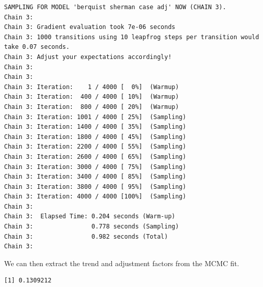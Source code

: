 \documentclass[
  letterpaper,
  DIV=11,
  numbers=noendperiod]{scrartcl}
\newenvironment{Shaded}{\begin{snugshade}}{\end{snugshade}}
\newcommand{\AttributeTok}[1]{\textcolor[rgb]{0.40,0.45,0.13}{#1}}
\newcommand{\FunctionTok}[1]{\textcolor[rgb]{0.28,0.35,0.67}{#1}}
\newcommand{\NormalTok}[1]{\textcolor[rgb]{0.00,0.23,0.31}{#1}}
\newcommand{\OtherTok}[1]{\textcolor[rgb]{0.00,0.23,0.31}{#1}}
\newcommand{\SpecialCharTok}[1]{\textcolor[rgb]{0.37,0.37,0.37}{#1}}
\begin{document}
\begin{verbatim}
SAMPLING FOR MODEL 'berquist sherman case adj' NOW (CHAIN 3).
Chain 3: 
Chain 3: Gradient evaluation took 7e-06 seconds
Chain 3: 1000 transitions using 10 leapfrog steps per transition would take 0.07 seconds.
Chain 3: Adjust your expectations accordingly!
Chain 3: 
Chain 3: 
Chain 3: Iteration:    1 / 4000 [  0%]  (Warmup)
Chain 3: Iteration:  400 / 4000 [ 10%]  (Warmup)
Chain 3: Iteration:  800 / 4000 [ 20%]  (Warmup)
Chain 3: Iteration: 1001 / 4000 [ 25%]  (Sampling)
Chain 3: Iteration: 1400 / 4000 [ 35%]  (Sampling)
Chain 3: Iteration: 1800 / 4000 [ 45%]  (Sampling)
Chain 3: Iteration: 2200 / 4000 [ 55%]  (Sampling)
Chain 3: Iteration: 2600 / 4000 [ 65%]  (Sampling)
Chain 3: Iteration: 3000 / 4000 [ 75%]  (Sampling)
Chain 3: Iteration: 3400 / 4000 [ 85%]  (Sampling)
Chain 3: Iteration: 3800 / 4000 [ 95%]  (Sampling)
Chain 3: Iteration: 4000 / 4000 [100%]  (Sampling)
Chain 3: 
Chain 3:  Elapsed Time: 0.204 seconds (Warm-up)
Chain 3:                0.778 seconds (Sampling)
Chain 3:                0.982 seconds (Total)
Chain 3: 
\end{verbatim}

We can then extract the trend and adjustment factors from the MCMC fit.

\begin{Shaded}
\end{Shaded}

\begin{verbatim}
[1] 0.1309212
\end{verbatim}
\end{document}
